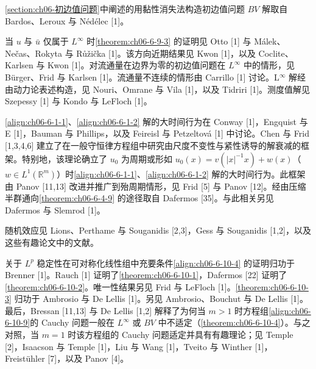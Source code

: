 \documentclass[../../main.tex]{subfiles}
\begin{document}
\cref{section:ch06-初边值问题}中阐述的用黏性消失法构造初边值问题 $BV$ 解取自 Bardos、Leroux 与 Nédélec [1]。

当 $u$ 与 $\bar{u}$ 仅属于 $L^{\infty}$ 时\cref{theorem:ch06-6-9-3} 的证明见 Otto [1] 与 Málek、Nečas、Rokyta 与 Růžička [1]。该方向近期结果见 Kwon [1]，以及 Coclite、Karlsen 与 Kwon [1]。对流通量在边界为零的初边值问题在 $L^{\infty}$ 中的情形，见 Bürger、Frid 与 Karlsen [1]。流通量不连续的情形由 Carrillo [1] 讨论。L$^{\infty}$ 解经由动力论表述构造，见 Nouri、Omrane 与 Vila [1]，以及 Tidriri [1]。测度值解见 Szepessy [1] 与 Kondo 与 LeFloch [1]。

\eqref{align:ch06-6-1-1}、\eqref{align:ch06-6-1-2} 解的大时间行为在 Conway [1]，Engquist 与 E [1]，Bauman 与 Phillips，以及 Feireisl 与 Petzeltová [1] 中讨论。Chen 与 Frid [1,3,4,6] 建立了在一般守恒律方程组中研究由尺度不变性与紧性诱导的解衰减的框架。特别地，该理论确立了 $u_{0}$ 为周期或形如 $u_{0}(x)=v(|x|^{-1}x)+w(x)$（$w\in L^{1}(\mathbb{R}^{m})$）时\eqref{align:ch06-6-1-1}、\eqref{align:ch06-6-1-2} 解的大时间行为。此框架由 Panov [11,13] 改进并推广到殆周期情形，见 Frid [5] 与 Panov [12]。经由压缩半群通向\cref{theorem:ch06-6-4-9} 的途径取自 Dafermos [35]。与此相关另见 Dafermos 与 Slemrod [1]。

随机效应见 Lions、Perthame 与 Souganidis [2,3]，Gess 与 Souganidis [1,2]，以及这些有趣论文中的文献。

关于 $L^{p}$ 稳定性在可对称化线性组中充要条件\eqref{align:ch06-6-10-4} 的证明归功于 Brenner [1]。Rauch [1] 证明了\cref{theorem:ch06-6-10-1}，Dafermos [22] 证明了\cref{theorem:ch06-6-10-2}。唯一性结果另见 Frid 与 LeFloch [1]。\cref{theorem:ch06-6-10-3} 归功于 Ambrosio 与 De Lellis [1]。另见 Ambrosio、Bouchut 与 De Lellis [1]。最后，Bressan [11,13] 与 De Lellis [1,2] 解释了为何当 $m>1$ 时方程组\eqref{align:ch06-6-10-9}的 Cauchy 问题一般在 $L^{\infty}$ 或 $BV$ 中不适定（\cref{theorem:ch06-6-10-4}）。与之对照，当 $m=1$ 时该方程组的 Cauchy 问题适定并具有有趣理论；见 Temple [2]，Isaacson 与 Temple [1]，Liu 与 Wang [1]，Tveito 与 Winther [1]，Freistühler [7]，以及 Panov [4]。
\end{document}
